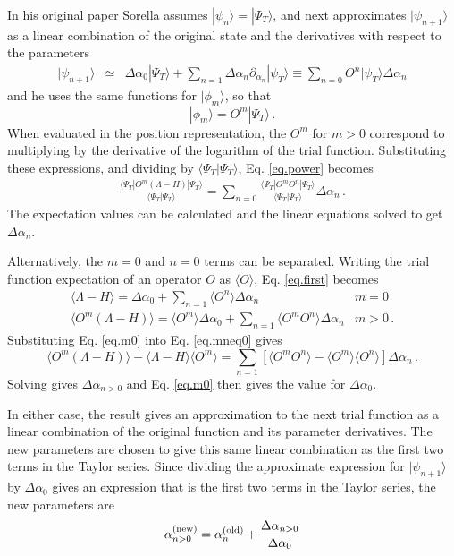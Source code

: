In his original paper Sorella assumes $|\psi_n \rangle = |\Psi_T\rangle$, and next approximates
$|\psi_{n+1}\rangle$ as a linear combination of the original state
and the derivatives with respect to the parameters
\begin{eqnarray}
\label{eq:psiprime}
|\psi_{n+1}\rangle &\simeq& \Delta \alpha_0 |\Psi_T\rangle
+\sum_{n=1} \Delta \alpha_n \partial_{\alpha_n} |\psi_T\rangle
\equiv \sum_{n=0} O^n |\psi_T\rangle \Delta \alpha_n
\end{eqnarray}
and he uses the same functions for $|\phi_m\rangle$, so that
\begin{equation}
|\phi_m\rangle = O^m |\Psi_T\rangle \,.
\end{equation}
When evaluated in the position representation, the $O^m$ for $m>0$ correspond
to multiplying by the derivative of the logarithm of the trial function.
Substituting these expressions, and dividing by $\langle \Psi_T|\Psi_T\rangle$,
Eq. \ref{eq.power} becomes
\begin{eqnarray}
\label{eq.first}
\frac{\langle \Psi_T |O^m (\Lambda-H) |\Psi_T\rangle}
{\langle \Psi_T |\Psi_T\rangle}
= \sum_{n=0} \frac{\langle \Psi_T |O^m O^n |\Psi_T\rangle}
{\langle \Psi_T |\Psi_T\rangle} \Delta \alpha_n\,.
\end{eqnarray}
The expectation values can be calculated and the linear equations solved
to get $\Delta \alpha_n$.

Alternatively, the $m=0$ and $n=0$ terms can be separated. Writing
the trial function expectation of an operator $O$ as $\langle O\rangle$,
Eq. \ref{eq.first} becomes
\begin{eqnarray}
\label{eq.m0}
\langle \Lambda - H \rangle = \Delta \alpha_0 + \sum_{n=1} \langle O^n\rangle
\Delta \alpha_n & m=0\\
\label{eq.mneq0}
\langle O^m (\Lambda-H) \rangle = \langle O^m\rangle \Delta \alpha_0
+ \sum_{n=1} \langle O^m O^n\rangle \Delta \alpha_n & m > 0 \,.
\end{eqnarray}
Substituting Eq. \ref{eq.m0} into Eq. \ref{eq.mneq0} gives
\begin{equation}
\label{eq:srpar}
\langle O^m(\Lambda - H) \rangle -\langle \Lambda - H\rangle \langle O^m\rangle
= \sum_{n=1} \left [ \langle O^mO^n\rangle - \langle O^m\rangle
\langle O^n\rangle \right ] \Delta \alpha_n \,.
\end{equation}
Solving gives $\Delta \alpha_{n>0}$ and
Eq. \ref{eq.m0} then gives the value for $\Delta \alpha_0$.

In either case, the result gives an approximation to the next trial
function as a linear combination of the original function and its
parameter derivatives. The new parameters are chosen to give this
same linear combination as the first two terms in the Taylor series.
Since dividing the approximate expression for $|\psi_{n+1}\rangle$
by $\Delta\alpha_0$ gives
an expression that is the first two terms in the Taylor series,
the new parameters are
\begin{equation}
\alpha^{(\rm new)}_{n>0} =
\alpha^{(\rm old)}_n + \frac{\Delta \alpha_{n>0}}{\Delta \alpha_0}
\end{equation}

